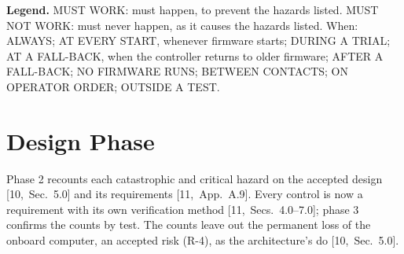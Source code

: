 \documentclass[11pt,a4paper]{article}
\begin{document}
\noindent\textbf{Legend.} MUST WORK: must happen, to prevent the hazards
listed. MUST NOT WORK: must never happen, as it causes the hazards listed.
When: ALWAYS; AT EVERY START, whenever firmware starts; DURING A TRIAL; AT A
FALL-BACK, when the controller returns to older firmware; AFTER A FALL-BACK;
NO FIRMWARE RUNS; BETWEEN CONTACTS; ON OPERATOR ORDER; OUTSIDE A TEST.

\section{Design Phase}
\label{sec:design}
Phase 2 recounts each catastrophic and critical hazard on the accepted design
[10,~Sec.~5.0] and its requirements [11,~App.~A.9]. Every control is now a
requirement with its own verification method [11,~Secs.~4.0--7.0]; phase 3
confirms the counts by test. The counts leave out the permanent loss of the
onboard computer, an accepted risk (R-4), as the architecture's do
[10,~Sec.~5.0].
\end{document}
